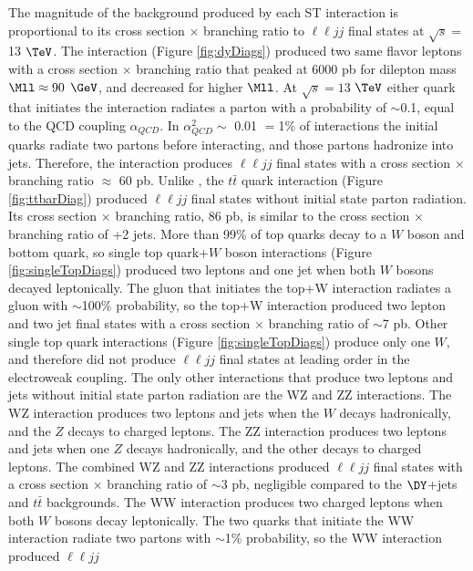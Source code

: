 The magnitude of the background produced by each ST interaction is proportional to its cross section $\times$ branching ratio 
to $\ell\ell jj$ final states at $\sqrt{s} =$ 13 $\TeV$.  The \DY interaction (Figure \ref{fig:dyDiags}) produced two same flavor 
leptons with a cross section $\times$ branching ratio that peaked at 6000 pb for dilepton mass $\Mll \approx 90$ $\GeV$, 
and decreased for higher $\Mll$.  At $\sqrt{s} = 13$ $\TeV$ either quark that initiates the \DY interaction 
radiates a parton with a probability of $\sim$0.1, equal to the QCD coupling $\alpha_{QCD}$.  In $\alpha_{QCD}^{2} \sim$
0.01 $=$1\% of \DY interactions the initial quarks radiate two partons before interacting, and those partons hadronize into 
jets.  Therefore, the \DY interaction produces $\ell\ell jj$ final states with a cross section $\times$ branching ratio $\approx$ 
60 pb.  Unlike \DY, the $t\bar{t}$ quark interaction (Figure \ref{fig:ttbarDiag}) produced $\ell\ell jj$ final states without 
initial state parton radiation.  Its cross section $\times$ branching ratio, 86 pb, is similar to the cross section $\times$ 
branching ratio of \DY+2 jets.  More than 99\% of top quarks decay to a $W$ boson and bottom quark, so single top quark+$W$ boson 
interactions (Figure \ref{fig:singleTopDiags}) produced two leptons and one jet when both $W$ bosons decayed 
leptonically.  The gluon that initiates the top+W interaction radiates a gluon with $\sim$100\% probability, so the top+W interaction 
produced two lepton and two jet final states with a cross section $\times$ branching ratio of $\sim$7 pb.  Other single top quark 
interactions (Figure \ref{fig:singleTopDiags}) produce only one $W$, and therefore did not produce $\ell\ell jj$ final states 
at leading order in the electroweak coupling.  The only other interactions that produce two 
leptons and jets without initial state parton radiation are the WZ and ZZ interactions.  The WZ interaction produces two leptons and 
jets when the $W$ decays hadronically, and the $Z$ decays to charged leptons.  The ZZ interaction produces two leptons and jets 
when one $Z$ decays hadronically, and the other decays to charged leptons.  The combined WZ and ZZ interactions produced $\ell\ell jj$ 
final states with a cross section $\times$ branching ratio of $\sim$3 pb, negligible compared to the $\DY$+jets 
and $t\bar{t}$ backgrounds.  The WW interaction produces two charged leptons when both $W$ bosons decay leptonically.  The two 
quarks that initiate the WW interaction radiate two partons with $\sim$1\% probability, so the WW interaction produced $\ell\ell jj$ 
